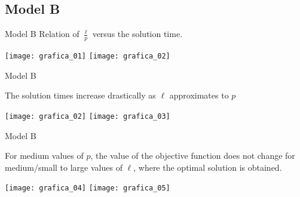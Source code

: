 \subsection{Model B}
\begin{frame}{Model B}
  Relation of $\frac{\ell}{p}$ versus the solution time.
  \begin{center}
    \texttt{[image: grafica\_01]}
    \texttt{[image: grafica\_02]}
  \end{center}
\end{frame}

\begin{frame}{Model B}

  The solution times increase drastically as $\ell$ approximates to $p$
  
  \begin{center}
    \texttt{[image: grafica\_02]}
    \texttt{[image: grafica\_03]}
  \end{center}
  
\end{frame}

\begin{frame}{Model B}

  For medium values of $p$, the value of the objective function does not change
  for medium/small to large values of $\ell$, where the optimal solution is obtained.

  \begin{center}
    \texttt{[image: grafica\_04]}
    \texttt{[image: grafica\_05]}
  \end{center}
  
\end{frame}

